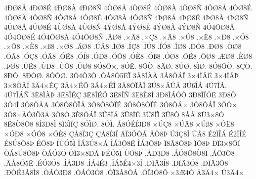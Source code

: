 {4^^d0^^d88^^c5
4^^d0^^d88^^c9
4^^d0^^d88^^c0
4^^d0^^d88^^d1
4^^d2^^d88^^c5
4^^d2^^d88^^c9
4^^d2^^d88^^c0
4^^d2^^d88^^d1
4^^d3^^d88^^c5
4^^d3^^d88^^c9
4^^d3^^d88^^c0
4^^d3^^d88^^d1
4^^d4^^d88^^c5
4^^d4^^d88^^c9
4^^d4^^d88^^c0
4^^d4^^d88^^d1
4^^de^^d88^^c5
4^^de^^d88^^c9
4^^de^^d88^^c0
4^^de^^d88^^d1
4^^db^^d88^^c5
4^^db^^d88^^c9
4^^db^^d88^^c0
4^^db^^d88^^d1
4^^dd^^d88^^c5
4^^dd^^d88^^c9
4^^dd^^d88^^c0
4^^dd^^d88^^d1
4^^d34^^d4^^d88^^c5
4^^d34^^d4^^d88^^c9
4^^d34^^d4^^d88^^c0
4^^d34^^d4^^d88^^d1
.^^c2^^d88
.^^d7^^c28
.^^d7^^c78
.^^d7^^c48
.^^d7^^da8
.^^d7^^cb8
.^^d7^^d08
.^^d7^^d38
.^^d7^^d48
.^^d7^^c88
.^^d7^^df8
.^^d7^^d88
.^^c4^^d88
.^^da^^c48
.^^cc^^d88
.^^cd^^c78
.^^cd^^da8
.^^cd^^d38
.^^ce^^d88
.^^d0^^d38
.^^d0^^d88
.^^d2^^d88
.^^d3^^c28
.^^d3^^c78
.^^d3^^c48
.^^d3^^cb8
.^^d3^^cd8
.^^d3^^d08
.^^d3^^d48
.^^d3^^c88
.^^d3^^df8
.^^d3^^d88
.^^d4^^cb8
.^^d4^^d88
.^^c6^^d88
.^^c8^^d88
.^^de^^d88
.^^db^^cb8
.^^db^^d08
.^^db^^d48
.^^db^^d88
8^^d38^^d4^^d7.
8^^d3^^cb.
8^^d4^^d2.
8^^c4^^d8.
8^^da^^d8.
8^^cc^^d8.
8^^d38^^d4^^d2.
8^^c7^^d2.
8^^d0^^d2.
8^^d0^^d2^^d8.
8^^d4^^d2^^d8.
3^^d34^^d43^^d2
.^^d2^^c18^^d35^^cb^^cf
3^^c28^^cc^^c0^^c4
3^^c28^^d2^^c1^^ce
3^^d74^^cc^^c5^^cb
3^^d74^^cc^^c5^^de
3^^d78^^d2^^c5^^cd
3^^c44^^d7^^c9^^c7
3^^c44^^d7^^c9^^d6
3^^c44^^d7^^c9^^ce
3^^c48^^d2^^cf^^c2^^ce
3^^da8^^d7^^c5^^da^^c4
3^^da6^^ce^^c1
4^^da7^^ce^^c1.
4^^da7^^ce^^c1^^d1
3^^cb8^^cc^^c0^^de
3^^cb8^^ce^^c9^^c7
3^^cb8^^ce^^c9^^d6
3^^cb8^^ce^^d1
3^^cb8^^c88^^cd
3^^d08^^cc^^c1^^d3^^d4
3^^d08^^cc^^cf^^d3^^cb
3^^d08^^d2
3^^d34^^cc
3^^d38^^d2^^c5^^c4
3^^d38^^d48^^d2^^cf^^c5
3^^d38^^d48^^d2^^cf^^c9
3^^d38^^d48^^d2^^cf^^ca
3^^d38^^d4^^c1^^d7
3^^d38^^d4^^c1^^ce
3^^d3^^d4^^d7
3^^d48^^d7^^c5^^d23^^d63^^c4
3^^d48^^d2
3^^c88^^d2^^c1^^ce
3^^db8^^cc^^c1
3^^db8^^cc^^c9
3^^db8^^cc^^cf
3^^db8^^d4
8^^c2^^c3
8^^da3^^d78^^d2
8^^cb8^^d28^^d48
8^^cd3^^d08^^cc
8^^cf3^^cc^^cf^^c7
8^^d3^^cc^^d8.
8^^d3^^cc.
^^c18^^d3^^c9^^cd3^^d08
^^d7^^da^^c78
^^d7^^da^^c48
^^d7^^da^^df8
^^d7^^d3^^cb8
^^d7^^d3^^d08
^^d7^^d3^^d48
^^d7^^d3^^c88
^^c7^^c58^^cf3^^c7
^^c7^^c58^^cf3^^cd
^^c4^^cf3^^d3^^d4^^c1
^^c5^^d58^^de
^^da3^^c78^^ce
^^da^^c28
^^c92^^cf^^ce^^c1
^^c92^^cf^^ce^^c9
^^c98^^da8^^d58^^de
^^c9^^d58^^de
^^cd^^d9^^d35^^cc
^^ce^^c13^^da8^^d7^^c1
^^ce^^c13^^d58^^cb
^^ce^^c13^^d58^^de
^^cf8^^c28^^d58^^de
^^cf^^d58^^de
^^d0^^cf3^^d78^^d4^^cf
^^d2^^c18^^da8^^d58^^de
^^d2^^c1^^d33^^d3
^^d3^^cf3^^d78^^d0^^c1
^^de^^c9^^d35^^cc
^^d9^^d58^^de
.^^c1^^d03^^d08
.^^c1^^d38^^d48^^d28^^cf
.^^c1^^d43^^d48
.^^c2^^c58^^d35^^cb
.^^c9^^d33^^d38
.^^ce^^c13^^d08
.^^ce^^c14^^c93
.^^ce^^c15^^c94^^d73^^ce
.^^d0^^cf^^c43^^cd8
.^^d0^^cf^^c43^^d38
.^^d0^^cf^^c43^^d48
.^^d0^^d2^^c93^^c28^^cc8
.^^d2^^c1^^d33^^d08
.^^d2^^c1^^d33^^d38
.^^d3^^cf3^^c28^^d2^^c1
.^^d3^^cf3^^d38^^d4
^^d73^^c64^^d2
^^c43^^c44^^d7
^^da3^^c44^^d7
}
